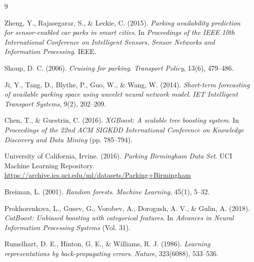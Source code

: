 \documentclass[12pt, a4paper]{article}
\begin{document}
\begin{thebibliography}{9}

Zheng, Y., Rajasegarar, S., \& Leckie, C. (2015).
\textit{Parking availability prediction for sensor-enabled car parks
in smart cities}.
In \textit{Proceedings of the IEEE 10th International Conference on
Intelligent Sensors, Sensor Networks and Information Processing}.
IEEE.

Shoup, D. C. (2006).
\textit{Cruising for parking}.
\textit{Transport Policy}, 13(6), 479--486.

Ji, Y., Tang, D., Blythe, P., Guo, W., \& Wang, W. (2014).
\textit{Short-term forecasting of available parking space using
wavelet neural network model}.
\textit{IET Intelligent Transport Systems}, 9(2), 202--209.

Chen, T., \& Guestrin, C. (2016).
\textit{XGBoost: A scalable tree boosting system}.
In \textit{Proceedings of the 22nd ACM SIGKDD International
Conference on Knowledge Discovery and Data Mining} (pp. 785--794).

University of California, Irvine. (2016).
\textit{Parking Birmingham Data Set}.
UCI Machine Learning Repository.
\url{https://archive.ics.uci.edu/ml/datasets/Parking+Birmingham}

Breiman, L. (2001).
\textit{Random forests}.
\textit{Machine Learning}, 45(1), 5--32.

Prokhorenkova, L., Gusev, G., Vorobev, A., Dorogush, A. V., \&
Gulin, A. (2018).
\textit{CatBoost: Unbiased boosting with categorical features}.
In \textit{Advances in Neural Information Processing Systems} (Vol. 31).

Rumelhart, D. E., Hinton, G. E., \& Williams, R. J. (1986).
\textit{Learning representations by back-propagating errors}.
\textit{Nature}, 323(6088), 533--536.

\end{thebibliography}
\end{document}
